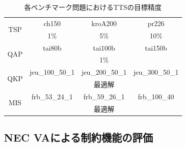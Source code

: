 \documentclass[submit,techrep,noauthor]{ipsj}
\begin{document}

\begin{table}[tb]
\centering
  \caption{各ベンチマーク問題におけるTTSの目標精度}
    \begin{tabular}{|c||c|c|c|}
      \hline
      \multirow{2}{*}{TSP} & ch150 & kroA200 & pr226\\
      \cline{2-2} \cline{3-3} \cline{4-4}
                              & 1\% & 5\% & 10\%\\ \hline
      \multirow{2}{*}{QAP} & tai80b & tai100b & tai150b\\
      \cline{2-2} \cline{3-3} \cline{4-4}
                            & \multicolumn{3}{|c|}{1\%}\\ \hline
      \multirow{2}{*}{QKP} & jeu\_100\_50\_1 & jeu\_200\_50\_1 & jeu\_300\_50\_1\\
      \cline{2-2} \cline{3-3} \cline{4-4}
                            & \multicolumn{3}{|c|}{最適解}\\ \hline
      \multirow{2}{*}{MIS} & frb\_53\_24\_1 & frb\_59\_26\_1 & frb\_100\_40\\
      \cline{2-2} \cline{3-3} \cline{4-4}
                            & \multicolumn{3}{|c|}{最適解}\\ \hline
    \end{tabular}
\label{table_target}
\end{table}

\subsection{NEC VAによる制約機能の評価}
\end{document}
